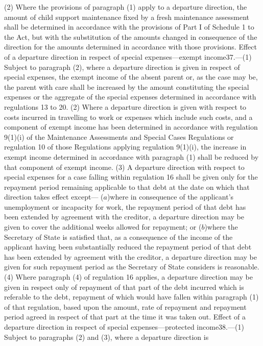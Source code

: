 \documentclass[a4paper]{article}
\begin{document}
(2) Where the provisions of paragraph (1) apply to a departure direction, the
amount of child support maintenance fixed by a fresh maintenance assessment
shall be determined in accordance with the provisions of Part I of Schedule 1 to
the Act, but with the substitution of the amounts changed in consequence of the
direction for the amounts determined in accordance with those provisions.
Effect of a departure direction in respect of special expenses—exempt
income37.—(1) Subject to paragraph (2), where a departure direction is given in
respect of special expenses, the exempt income of the absent parent or, as the
case may be, the parent with care shall be increased by the amount constituting
the special expenses or the aggregate of the special expenses determined in
accordance with regulations 13 to 20.
(2) Where a departure direction is given with respect to costs incurred in
travelling to work or expenses which include such costs, and a component of
exempt income has been determined in accordance with regulation 9(1)(i) of the
Maintenance Assessments and Special Cases Regulations or regulation 10 of those
Regulations applying regulation 9(1)(i), the increase in exempt income
determined in accordance with paragraph (1) shall be reduced by that component
of exempt income.
(3) A departure direction with respect to special expenses for a case falling
within regulation 16 shall be given only for the repayment period remaining
applicable to that debt at the date on which that direction takes effect except—
($a$)where in consequence of the applicant’s unemployment or incapacity for work,
the repayment period of that debt has been extended by agreement with the
creditor, a departure direction may be given to cover the additional weeks
allowed for repayment; or
($b$)where the Secretary of State is satisfied that, as a consequence of the
income of the applicant having been substantially reduced the repayment period
of that debt has been extended by agreement with the creditor, a departure
direction may be given for such repayment period as the Secretary of State
considers is reasonable.
(4) Where paragraph (4) of regulation 16 applies, a departure direction may be
given in respect only of repayment of that part of the debt incurred which is
referable to the debt, repayment of which would have fallen within paragraph (1)
of that regulation, based upon the amount, rate of repayment and repayment
period agreed in respect of that part at the time it was taken out.
Effect of a departure direction in respect of special expenses—protected
income38.—(1) Subject to paragraphs (2) and (3), where a departure direction is
\end{document}
